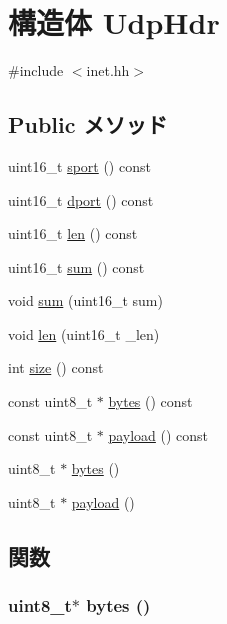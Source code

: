\hypertarget{structNet_1_1UdpHdr}{
\section{構造体 UdpHdr}
\label{structNet_1_1UdpHdr}
}


{\ttfamily \#include $<$inet.hh$>$}\subsection*{Public メソッド}
\begin{DoxyCompactItemize}
\item 
uint16\_\-t \hyperlink{structNet_1_1UdpHdr_ac8b130feab6c3c849b62ee42ad32d6c2}{sport} () const 
\item 
uint16\_\-t \hyperlink{structNet_1_1UdpHdr_aba1e568ee57bc49dc901f0beb54a62af}{dport} () const 
\item 
uint16\_\-t \hyperlink{structNet_1_1UdpHdr_aca537e1680645b058d622981e2fb1c13}{len} () const 
\item 
uint16\_\-t \hyperlink{structNet_1_1UdpHdr_acbf3c502c7393ef0178454b237b2562f}{sum} () const 
\item 
void \hyperlink{structNet_1_1UdpHdr_ae0171ec0578adacce8cceb6a804f97f1}{sum} (uint16\_\-t sum)
\item 
void \hyperlink{structNet_1_1UdpHdr_a6d227a891dced5a88df38f29d545e8aa}{len} (uint16\_\-t \_\-len)
\item 
int \hyperlink{structNet_1_1UdpHdr_ab8e4e3e2a7bf18888b71bdf9dda0770b}{size} () const 
\item 
const uint8\_\-t $\ast$ \hyperlink{structNet_1_1UdpHdr_aaa586eeaf354005403ca8e20f961b6c3}{bytes} () const 
\item 
const uint8\_\-t $\ast$ \hyperlink{structNet_1_1UdpHdr_a5f0d069ddb9d067af9e94963bd1fc7a2}{payload} () const 
\item 
uint8\_\-t $\ast$ \hyperlink{structNet_1_1UdpHdr_add4fb6fe45a091194dc9eac521194698}{bytes} ()
\item 
uint8\_\-t $\ast$ \hyperlink{structNet_1_1UdpHdr_a79ce21e3572e587b71de7af1ac640b6f}{payload} ()
\end{DoxyCompactItemize}


\subsection{関数}
\hypertarget{structNet_1_1UdpHdr_add4fb6fe45a091194dc9eac521194698}{
\subsubsection[{bytes}]{\setlength{\rightskip}{0pt plus 5cm}uint8\_\-t$\ast$ bytes ()}}
\label{structNet_1_1UdpHdr_add4fb6fe45a091194dc9eac521194698}



